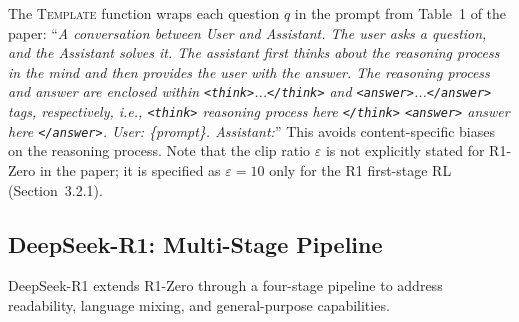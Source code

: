 \documentclass[11pt,a4paper]{article}
\begin{document}
\medskip

The \textsc{Template} function wraps each question $q$ in the prompt from Table~1 of the paper: ``\textit{A conversation between User and Assistant. The user asks a question, and the Assistant solves it. The assistant first thinks about the reasoning process in the mind and then provides the user with the answer. The reasoning process and answer are enclosed within \texttt{<think>}...\texttt{</think>} and \texttt{<answer>}...\texttt{</answer>} tags, respectively, i.e., \texttt{<think>} reasoning process here \texttt{</think>} \texttt{<answer>} answer here \texttt{</answer>}. User: \{prompt\}. Assistant:}'' This avoids content-specific biases on the reasoning process. Note that the clip ratio $\varepsilon$ is not explicitly stated for R1-Zero in the paper; it is specified as $\varepsilon = 10$ only for the R1 first-stage RL (Section~3.2.1).

\subsection{DeepSeek-R1: Multi-Stage Pipeline}

DeepSeek-R1 extends R1-Zero through a four-stage pipeline to address readability, language mixing, and general-purpose capabilities.
\end{document}
